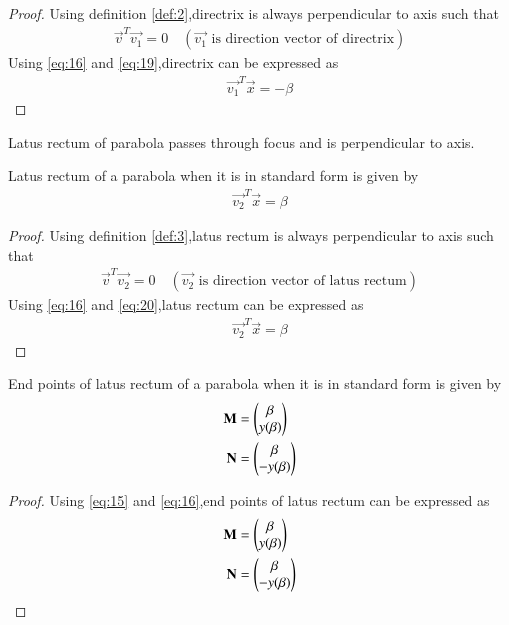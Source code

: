 \documentclass[journal,12pt,twocolumn]{IEEEtran}
\begin{document}
\begin{proof}
Using definition \ref{def:2},directrix is always perpendicular to axis such that
\begin{align}
\vec{v}^T\vec{v_1} = 0 \quad (\text{$\vec{v_1}$ is direction vector of directrix}) \label{eq:19}
\end{align}
Using \eqref{eq:16} and \eqref{eq:19},directrix can be expressed as 
\begin{align}
    \vec{v_1}^T\vec{x} = -\beta 
\end{align}
\end{proof}
\begin{definition}
Latus rectum of parabola passes through focus and is perpendicular to axis. \label{def:3}
\end{definition}
\begin{lemma}
Latus rectum of a parabola when it is in standard form is given by 
\begin{align}
    \vec{v_2}^T\vec{x} = \beta 
\end{align}
\end{lemma}
\begin{proof}
Using definition \ref{def:3},latus rectum is always perpendicular to axis such that
\begin{align}
    \vec{v}^T\vec{v_2} = 0 \quad (\text{$\vec{v_2}$ is direction vector of latus rectum}) \label{eq:20}
\end{align}
Using \eqref{eq:16} and \eqref{eq:20},latus rectum can be expressed as 
\begin{align}
    \vec{v_2}^T\vec{x} = \beta 
\end{align}
\end{proof}
\begin{lemma}
End points of latus rectum of a parabola when it is in standard form is given by
\begin{align}
    \mathbf{M}&=\begin{pmatrix}\beta \\ y(\beta)\end{pmatrix} 
    \\
    \mathbf{N}&=\begin{pmatrix}\beta \\ -y(\beta)\end{pmatrix} 
\end{align}
\end{lemma}
\begin{proof}
Using \eqref{eq:15} and \eqref{eq:16},end points of latus rectum can be expressed as 
\begin{align}
    \mathbf{M}&=\begin{pmatrix}\beta \\ y(\beta)\end{pmatrix} \label{eq:17}
    \\
    \mathbf{N}&=\begin{pmatrix}\beta \\ -y(\beta)\end{pmatrix} \label{eq:18}
\end{align}
\end{proof}
\end{document}
